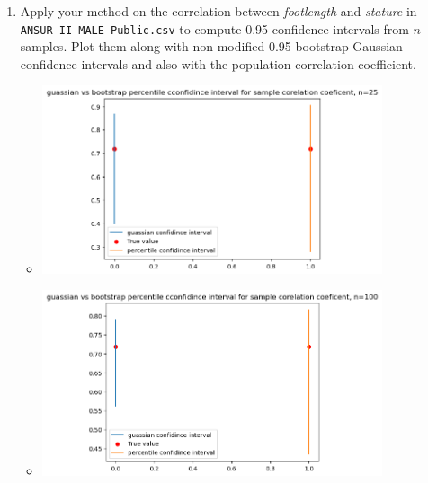 \documentclass[12pt,twoside]{article}
\begin{document}
\begin{enumerate}
\begin{enumerate}
\item 
Apply your method on the correlation between \textit{footlength} and \textit{stature} in \texttt{ANSUR\ II\ MALE\ Public.csv} to compute 0.95 confidence intervals from $n$ samples. Plot them along with non-modified 0.95 bootstrap Gaussian confidence intervals and also with the population correlation coefficient.
\begin{itemize}
    \color{blue}
    \item \includegraphics[width=10cm]{homework/homework_5/immages/quistion1b_1.png}
    \item \includegraphics[width=10cm]{homework/homework_5/immages/quistion1b_2.png}
\end{itemize}



\end{enumerate}
\end{enumerate}
\end{document}
